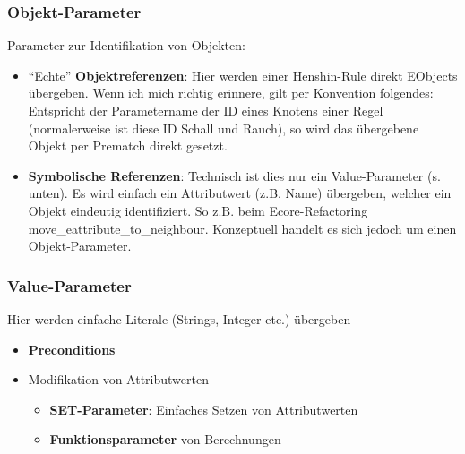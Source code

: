 \subsubsection{Objekt-Parameter}
Parameter zur Identifikation von Objekten:

\begin{itemize}
 
 \item ``Echte'' \textbf{Objektreferenzen}: Hier werden einer Henshin-Rule direkt EObjects übergeben. Wenn ich mich richtig erinnere, 	gilt per Konvention folgendes: Entspricht der Parametername der ID eines Knotens einer Regel (normalerweise ist diese ID Schall und Rauch), so wird das übergebene Objekt per Prematch direkt gesetzt.
 
 \item \textbf{Symbolische Referenzen}: Technisch ist dies nur ein Value-Parameter (s. unten). Es wird einfach ein Attributwert (z.B. Name) übergeben, welcher ein Objekt eindeutig identifiziert. So z.B. beim Ecore-Refactoring move\_eattribute\_to\_neighbour. Konzeptuell handelt es sich jedoch um einen Objekt-Parameter.
 

\end{itemize}




\subsubsection{Value-Parameter} 
Hier werden einfache Literale (Strings, Integer etc.) übergeben

\begin{itemize}
  \item \textbf{Preconditions}
  \item Modifikation von Attributwerten
    \begin{itemize}
      \item \textbf{SET-Parameter}: Einfaches Setzen von Attributwerten
      \item \textbf{Funktionsparameter} von Berechnungen
    \end{itemize}
\end{itemize}


